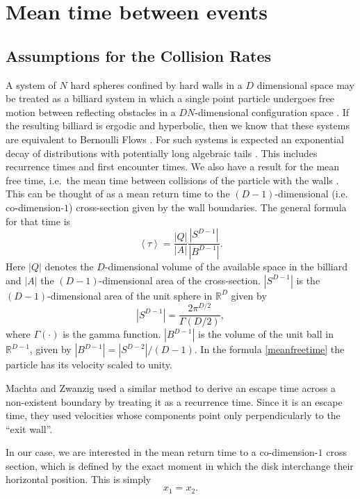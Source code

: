 \documentclass[a4paper,10pt, jcp, aps, preprint]{revtex4-1}
\newcommand{\mean}[1]{\left \langle #1 \right \rangle}
\newcommand{\RR}{\mathbb{R}}
\begin{document}
\section{Mean time between events}


\subsection{Assumptions for the Collision Rates}

A system of $N$ hard spheres confined by hard walls in a $D$ dimensional
space may be treated as a billiard system 
in which a single point  particle undergoes free motion between reflecting obstacles 
in a $ D N $-dimensional configuration space \cite{Sinai70, MarkChern}. 
If the resulting billiard is ergodic and hyperbolic, then we know that
these systems are equivalent to Bernoulli Flows \cite{Gallavotti74}.
For such systems is expected an exponential decay of 
distributions \cite{AbadiGalves} with potentially
long algebraic tails \cite{ZasTip}. 
This includes recurrence times and
first encounter times. We also
have a result for the mean free time, i.e.\ the mean time between 
collisions of the particle with the walls \cite{MarkChern}. 
This can be thought of as a mean return time to the $(D-1)$-dimensional 
(i.e. co-dimension-$1$) cross-section given by the wall boundaries.
The general formula for that time is
\begin{equation}\label{meanfreetime}
 \mean{\tau} = \frac{|Q|}{|A|} \frac{|S^{D-1}|}{|B^{D-1}|}.
\end{equation}
Here $|Q|$ denotes the $D$-dimensional volume of the available 
space in the billiard and 
$|A|$ the $(D-1)$-dimensional area of the cross-section.
 $|S^{D-1}|$ is the $(D-1)$-dimensional area of the unit sphere in $\RR^D$ given by
\begin{equation}
  |S^{D-1}| = \frac{2 \pi^{D/2}}{\Gamma(D/2)},
\end{equation}
where $\Gamma(\cdot)$ is the gamma function. 
$|B^{D-1}|$ is the volume of the unit ball 
in $\RR^{D-1}$, given by $|B^{D-1}| = |S^{D-2}| / (D-1)$.
In the formula \ref{meanfreetime}  the particle has 
its velocity scaled to unity.

Machta and Zwanzig \cite{MachtaZwan} used a similar method to derive an escape 
time across a non-existent boundary by treating it as a recurrence time.
Since it is an escape time, they used velocities whose components point only 
perpendicularly to the ``exit wall''.

In our case, we are interested in the mean return time to 
a co-dimension-$1$ cross section, 
which is defined by the exact moment
in which the disk interchange their horizontal position. This is simply
\begin{equation} \label{condchoque}
x_1 = x_2.
\end{equation}
\end{document}
